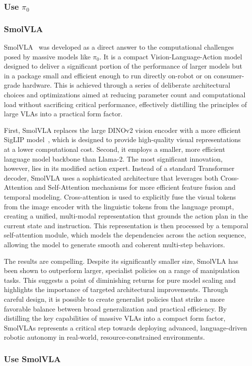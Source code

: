 \subsubsection{Use \( \pi_0 \)}

\subsubsection{SmolVLA}
SmolVLA~\citep{shukorSmolVLAVisionLanguageActionModel2025} was developed as a direct answer to the computational challenges posed by massive models like \( \pi_0 \).
It is a compact Vision-Language-Action model designed to deliver a significant portion of the performance of larger models but in a package small and efficient enough to run directly on-robot or on consumer-grade hardware.
This is achieved through a series of deliberate architectural choices and optimizations aimed at reducing parameter count and computational load without sacrificing critical performance, effectively distilling the principles of large VLAs into a practical form factor.

First, SmolVLA replaces the large DINOv2 vision encoder with a more efficient SigLIP model~\citep{zhaiSigmoidLossLanguageImage2023}, which is designed to provide high-quality visual representations at a lower computational cost.
Second, it employs a smaller, more efficient language model backbone than Llama-2.
The most significant innovation, however, lies in its modified action expert.
Instead of a standard Transformer decoder, SmolVLA uses a sophisticated architecture that leverages both Cross-Attention and Self-Attention mechanisms for more efficient feature fusion and temporal modeling.
Cross-attention is used to explicitly fuse the visual tokens from the image encoder with the linguistic tokens from the language prompt, creating a unified, multi-modal representation that grounds the action plan in the current state and instruction.
This representation is then processed by a temporal self-attention module, which models the dependencies across the action sequence, allowing the model to generate smooth and coherent multi-step behaviors.

The results are compelling.
Despite its significantly smaller size, SmolVLA has been shown to outperform larger, specialist policies on a range of manipulation tasks.
This suggests a point of diminishing returns for pure model scaling and highlights the importance of targeted architectural improvements. Through careful design, it is possible to create generalist policies that strike a more favorable balance between broad generalization and practical efficiency.
By distilling the key capabilities of massive VLAs into a compact form factor, SmolVLAs represents a critical step towards deploying advanced, language-driven robotic autonomy in real-world, resource-constrained environments.

\subsubsection{Use SmolVLA}

